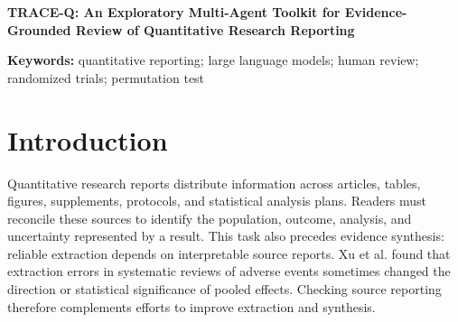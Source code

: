 \documentclass[12pt,a4paper]{article}
\begin{document}
\begin{center}
{\Large\bfseries TRACE-Q: An Exploratory Multi-Agent Toolkit for Evidence-Grounded Review of Quantitative Research Reporting\par}
\vspace{7pt}{\small Draft manuscript --- October 22, 2026}
\end{center}
\begin{abstract}
Quantitative reporting issues can be difficult to assess when evidence is spread across an article, supplements, protocols, and statistical analysis plans. We describe TRACE-Q, an exploratory multi-agent toolkit that links source mapping, quantitative checks, inclusion screening, rechecking, and audit to human review. We examined workflow TRACE-Q in an availability sample of 44 randomized trial packages published in \textit{JAMA} in 2018--2019 and 2024--2025, using final human-reviewed workbooks. Of 440 candidates, 413 were retained and 27 excluded. Retention included descriptive protocol--report differences and did not imply confirmation. The principal endpoint comprised 41 confirmed or probable substantive statistical issues in report materials, occurring in 22 papers. Mean counts were 1.05 per paper in 2018--2019 and 0.84 in 2024--2025 (difference, $-0.21$; 95\% bootstrap confidence interval, $-1.02$ to 0.56; exact paper-level permutation $P=0.654$). TRACE-Q provides a structured record of concerns for human assessment. This development application did not assess missed issues, diagnostic accuracy, or efficiency. Availability sampling and a single recorded reviewer limit generalization, and the period comparison does not establish a change in reporting quality.
\end{abstract}
\noindent\textbf{Keywords:} quantitative reporting; large language models; human review; randomized trials; permutation test


\section{Introduction}
Quantitative research reports distribute information across articles, tables, figures, supplements, protocols, and statistical analysis plans. Readers must reconcile these sources to identify the population, outcome, analysis, and uncertainty represented by a result. This task also precedes evidence synthesis: reliable extraction depends on interpretable source reports. Xu et al. found that extraction errors in systematic reviews of adverse events sometimes changed the direction or statistical significance of pooled effects.\cite{xu2022extraction} Checking source reporting therefore complements efforts to improve extraction and synthesis.
\end{document}
